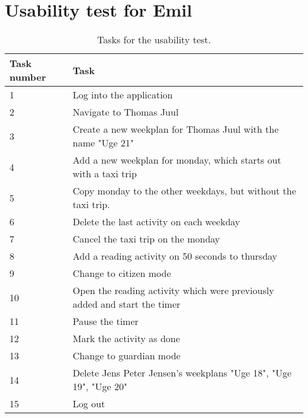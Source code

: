 \section{Usability test for Emil}\label{usability-test-14-05-emil}
\begin{table}[H]
    \small
    \begin{tabular}{|p{1.3cm}|p{12cm}|}
    \hline
    Task number      &Task                                                               \\ \hline
    1 & Log into the application                                                              \\ \hline
    2 & Navigate to Thomas Juul                                                          \\ \hline
    3 & Create a new weekplan for Thomas Juul with the name "Uge 21"                      \\ \hline
    4 & Add a new weekplan for monday, which starts out with a taxi trip                            \\ \hline
    5 & Copy monday to the other weekdays, but without the taxi trip.                             \\ \hline
    6 & Delete the last activity on each weekday                                                \\ \hline
    7 & Cancel the taxi trip on the monday                                                      \\ \hline
    8 & Add a reading activity on 50 seconds to thursday                                      \\ \hline
    9 & Change to citizen mode                                                       \\ \hline
    10 & Open the reading activity which were previously added and start the timer     \\ \hline
    11 & Pause the timer                                                                  \\ \hline
    12 & Mark the activity as done                                                       \\ \hline
    13 & Change to guardian mode                                                        \\ \hline
    14 & Delete Jens Peter Jensen's weekplans "Uge 18", "Uge 19", "Uge 20"              \\ \hline
    15 & Log out                                                                        \\ \hline
    \end{tabular}
    \caption{Tasks for the usability test.}\label{table:emil_usability_tasks}
\end{table}

